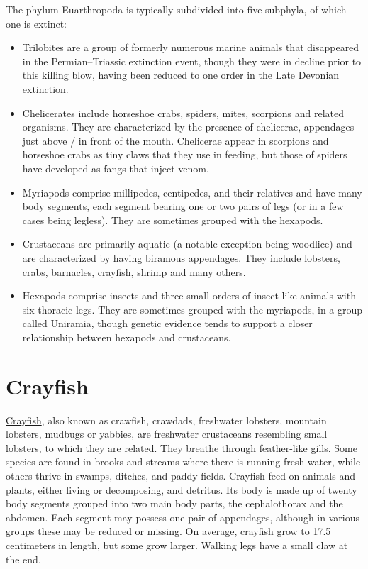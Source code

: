 The phylum Euarthropoda is typically subdivided into five subphyla, of
which one is extinct:

\begin{itemize}
\tightlist
\item
  Trilobites are a group of formerly numerous marine animals that
  disappeared in the Permian--Triassic extinction event, though they
  were in decline prior to this killing blow, having been reduced to one
  order in the Late Devonian extinction.
\item
  Chelicerates include horseshoe crabs, spiders, mites, scorpions and
  related organisms. They are characterized by the presence of
  chelicerae, appendages just above / in front of the mouth. Chelicerae
  appear in scorpions and horseshoe crabs as tiny claws that they use in
  feeding, but those of spiders have developed as fangs that inject
  venom.
\item
  Myriapods comprise millipedes, centipedes, and their relatives and
  have many body segments, each segment bearing one or two pairs of legs
  (or in a few cases being legless). They are sometimes grouped with the
  hexapods.
\item
  Crustaceans are primarily aquatic (a notable exception being woodlice)
  and are characterized by having biramous appendages. They include
  lobsters, crabs, barnacles, crayfish, shrimp and many others.
\item
  Hexapods comprise insects and three small orders of insect-like
  animals with six thoracic legs. They are sometimes grouped with the
  myriapods, in a group called Uniramia, though genetic evidence tends
  to support a closer relationship between hexapods and crustaceans.
\end{itemize}

\section{Crayfish}\label{crayfish}

\href{https://en.wikipedia.org/wiki/Crayfish}{Crayfish}, also known as
crawfish, crawdads, freshwater lobsters, mountain lobsters, mudbugs or
yabbies, are freshwater crustaceans resembling small lobsters, to which
they are related. They breathe through feather-like gills. Some species
are found in brooks and streams where there is running fresh water,
while others thrive in swamps, ditches, and paddy fields. Crayfish feed
on animals and plants, either living or decomposing, and detritus. Its
body is made up of twenty body segments grouped into two main body
parts, the cephalothorax and the abdomen. Each segment may possess one
pair of appendages, although in various groups these may be reduced or
missing. On average, crayfish grow to 17.5 centimeters in length, but
some grow larger. Walking legs have a small claw at the end.

